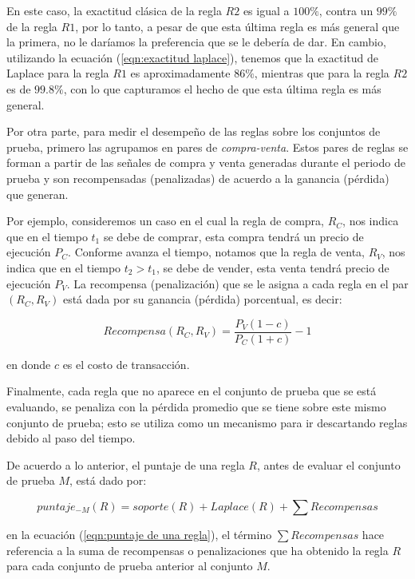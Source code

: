\documentclass[12pt]{scrbook}
\theoremstyle{break}
\theoremstyle{break}
\begin{document}
En este caso, la exactitud clásica de la regla $R2$ es igual a $100\%$, contra un $99\%$ de la regla $R1$, por lo tanto, a pesar de que esta última regla es más general que la primera, no le daríamos la preferencia que se le debería de dar. En cambio, utilizando la ecuación (\ref{eqn:exactitud laplace}), tenemos que la exactitud de Laplace para la regla $R1$  es aproximadamente $86\%$, mientras que para la regla $R2$ es de $99.8 \%$, con lo que capturamos el hecho de que esta última regla es más general.

Por otra parte, para medir el desempeño de las reglas sobre los conjuntos de prueba, primero las agrupamos en pares de \textit{compra-venta}. Estos pares de reglas se forman a partir de las señales de compra y venta generadas durante el periodo de prueba y son recompensadas (penalizadas) de acuerdo a la ganancia (pérdida) que generan.

Por ejemplo, consideremos un caso en el cual la regla de compra, $R_{C}$, nos indica que en el tiempo $t_1$ se debe de comprar, esta compra tendrá un precio de ejecución $P_{C}$. Conforme avanza el tiempo, notamos que la regla de venta, $R_{V}$, nos indica que en el tiempo $t_2 > t_1$, se debe de vender, esta venta tendrá precio de ejecución $P_{V}$. La recompensa (penalización) que se le asigna a cada regla en el par $\left(R_C, R_V\right)$ está dada por su ganancia (pérdida) porcentual, es decir:

\begin{equation}\label{eqn:recompensa reglas}
Recompensa(R_C, R_V) = \dfrac{P_V (1 - c)}{P_C (1 + c) } - 1
\end{equation}

en donde $c$ es el costo de transacción.

Finalmente, cada regla que no aparece en el conjunto de prueba que se está evaluando, se penaliza con la pérdida promedio que se tiene sobre este mismo conjunto de prueba; esto se utiliza como un mecanismo para ir descartando reglas debido al paso del tiempo.

De acuerdo a lo anterior, el puntaje de una regla $R$, antes de evaluar el conjunto de prueba $M$, está dado por:

\begin{equation} \label{eqn:puntaje de una regla}
puntaje_{-M}(R) = soporte(R) + Laplace(R) + \sum Recompensas
\end{equation}

en la ecuación (\ref{eqn:puntaje de una regla}), el término $ \sum Recompensas$ hace referencia a la suma de recompensas o penalizaciones que ha obtenido la regla $R$ para cada conjunto de prueba anterior al conjunto $M$.
\end{document}

